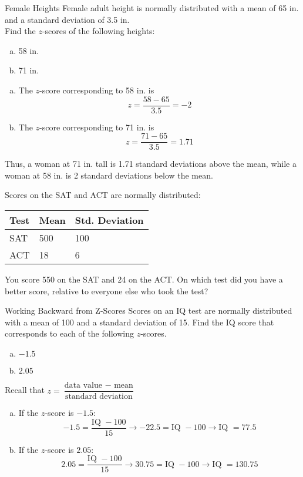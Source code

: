 \begin{example}[https://www.youtube.com/watch?v=DKmhYrgywMc]{Female Heights}
Female adult height is normally distributed with a mean of 65 in. and a standard deviation of 3.5 in.\\

Find the $z$-scores of the following heights:
\begin{enumerate}[(a)]
\item 58 in.
\item 71 in.
\end{enumerate}

\begin{enumerate}[(a)]
\item The $z$-score corresponding to 58 in. is
\[z=\dfrac{58-65}{3.5} = -2\]
\item The $z$-score corresponding to 71 in. is
\[z = \dfrac{71-65}{3.5} = 1.71\]
\end{enumerate}
Thus, a woman at 71 in. tall is 1.71 standard deviations above the mean, while a woman at 58 in. is 2 standard deviations below the mean.
\end{example}

\begin{try}
Scores on the SAT and ACT are normally distributed:
\begin{center}
\begin{tabular}{l l l}
Test & Mean & Std. Deviation\\
\hline
SAT & 500 & 100\\
ACT & 18 & 6
\end{tabular}
\end{center}
You score 550 on the SAT and 24 on the ACT.  On which test did you have a better score, relative to everyone else who took the test?
\end{try}

\begin{example}[https://www.youtube.com/watch?v=qfg_DWgY3Hg]{Working Backward from Z-Scores}
Scores on an IQ test are normally distributed with a mean of 100 and a standard deviation of 15.  Find the IQ score that corresponds to each of the following $z$-scores.
\begin{enumerate}[(a)]
\item $-1.5$
\item $2.05$
\end{enumerate}

Recall that $z=\dfrac{\textrm{data value } - \textrm{ mean}}{\textrm{standard deviation}}$
\begin{enumerate}[(a)]
\item If the $z$-score is $-1.5$:
\[-1.5=\dfrac{\textrm{IQ } - 100}{15} \longrightarrow -22.5 = \textrm{IQ } - 100 \longrightarrow \textrm{IQ } = 77.5\]
\item If the $z$-score is $2.05$:
\[2.05=\dfrac{\textrm{IQ } - 100}{15} \longrightarrow 30.75 = \textrm{IQ } - 100 \longrightarrow \textrm{IQ } = 130.75\]
\end{enumerate}
\end{example}

